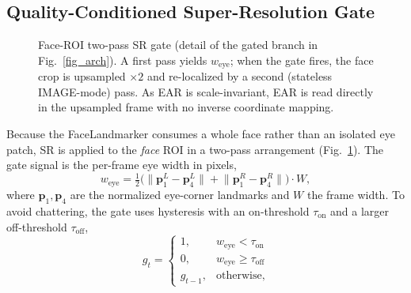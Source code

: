 \documentclass{IEEE_lsens}
\begin{document}
\subsection{Quality-Conditioned Super-Resolution Gate}
\begin{figure}[!t]
\centering
{}
\caption{Face-ROI two-pass SR gate (detail of the gated branch in
Fig.~\ref{fig_arch}). A first pass yields $w_{\text{eye}}$; when the gate fires,
the face crop is upsampled $\times2$ and re-localized by a second (stateless
IMAGE-mode) pass. As EAR is scale-invariant, EAR is read directly in the
upsampled frame with no inverse coordinate mapping.}
\label{fig_srgate}
\end{figure}
Because the FaceLandmarker consumes a whole face rather than an isolated eye
patch, SR is applied to the \emph{face} ROI in a two-pass arrangement
(Fig.~\ref{fig_srgate}). The gate signal is the per-frame eye width in pixels,
\begin{equation}
w_{\text{eye}}=\tfrac{1}{2}\big(\lVert \bm{p}_1^{L}-\bm{p}_4^{L}\rVert
+\lVert \bm{p}_1^{R}-\bm{p}_4^{R}\rVert\big)\cdot W,
\label{eq_weye}
\end{equation}
where $\bm{p}_1,\bm{p}_4$ are the normalized eye-corner landmarks and $W$ the
frame width. To avoid chattering, the gate uses hysteresis with an on-threshold
$\tau_{\text{on}}$ and a larger off-threshold $\tau_{\text{off}}$,
\begin{equation}
g_t=\begin{cases}
1, & w_{\text{eye}}<\tau_{\text{on}}\\[2pt]
0, & w_{\text{eye}}\ge \tau_{\text{off}}\\[2pt]
g_{t-1}, & \text{otherwise,}
\end{cases}
\label{eq_gate}
\end{equation}
\end{document}
